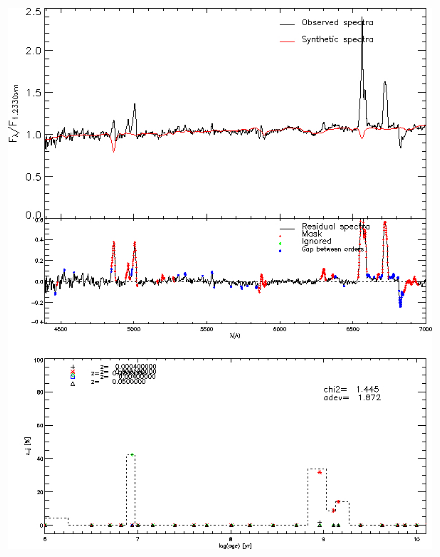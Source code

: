 \begin{figure}[ht!]
\begin{center}
        \includegraphics[scale = 0.35]{figuras/sp4.jpg}
        \label{fig:my_label}
    \end{center}
\end{figure}